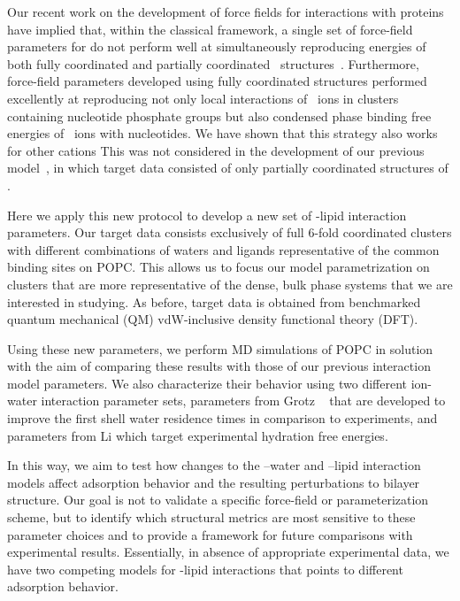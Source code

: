 Our recent work on the development of force fields for \mg{} interactions with proteins
have implied that, within the classical framework, a single set of force-field parameters for \mg{} do not perform well at simultaneously reproducing
energies of both fully coordinated
and partially coordinated \mg~structures~\cite{julian:2023:mg}. Furthermore, force-field parameters developed using fully coordinated structures performed excellently at reproducing not only local interactions of \mg~ions in clusters containing nucleotide phosphate groups but also condensed phase binding free energies of \mg~ions with nucleotides\cite{julian:2023:mg}. We have shown that this strategy also works for other cations \cite{julian:2025:atpcomp}
This was not considered in the development of our previous \mg{} model~\cite{saunders:2024}, in which target data consisted of only partially coordinated structures of \mg.

Here we apply this new protocol to develop a new set of \mg{}-lipid
interaction parameters. Our target data consists exclusively of full 6-fold coordinated \mg clusters with
different combinations of waters and ligands representative of the common binding sites on POPC.
This allows us to focus our model parametrization on clusters that are more representative of the dense, bulk phase systems
that we are interested in studying. As before, target data is obtained from benchmarked quantum mechanical (QM) vdW-inclusive density functional theory (DFT).

Using these new parameters, we perform MD simulations of POPC in \mgcl{} solution with the aim of comparing these results
with those of our previous interaction model parameters. We also characterize their behavior using two different
ion-water interaction parameter sets, parameters from Grotz \etal~\cite{grotz:2021:optimized,micro} that are developed to
improve the first shell water residence times in comparison to experiments, and parameters from Li
\etal{}\cite{merzhfe} which target experimental hydration free energies.

In this way, we aim to test how changes to the \mg–water and \mg–lipid interaction models affect adsorption behavior and
the resulting perturbations to bilayer structure. Our goal is not to validate a specific force-field or parameterization scheme,
but to identify which structural metrics are most sensitive to these parameter choices and to provide a framework for future
comparisons with experimental results. Essentially, in absence of appropriate experimental data, we have two competing models for \mg-lipid interactions
that points to different adsorption behavior.


